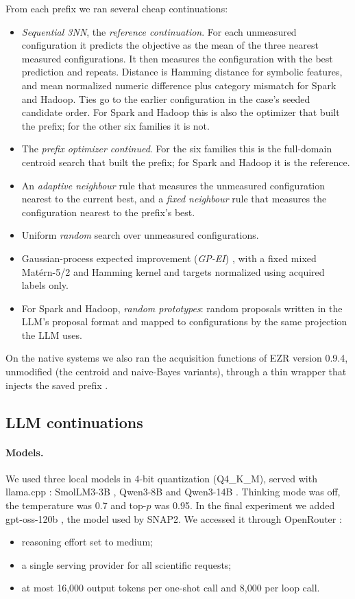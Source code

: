From each prefix we ran several cheap continuations:
\begin{itemize}
  \item \emph{Sequential 3NN}, the \emph{reference continuation}. For each unmeasured configuration it predicts the objective as the mean of the three nearest measured configurations. It then measures the configuration with the best prediction and repeats. Distance is Hamming distance for symbolic features, and mean normalized numeric difference plus category mismatch for Spark and Hadoop. Ties go to the earlier configuration in the case's seeded candidate order. For Spark and Hadoop this is also the optimizer that built the prefix; for the other six families it is not.
  \item The \emph{prefix optimizer continued}. For the six families this is the full-domain centroid search that built the prefix; for Spark and Hadoop it is the reference.
  \item An \emph{adaptive neighbour} rule that measures the unmeasured configuration nearest to the current best, and a \emph{fixed neighbour} rule that measures the configuration nearest to the prefix's best.
  \item Uniform \emph{random} search over unmeasured configurations.
  \item Gaussian-process expected improvement (\emph{GP-EI}) \cite{jones1998ego}, with a fixed mixed Mat\'ern-5/2 and Hamming kernel and targets normalized using acquired labels only.
  \item For Spark and Hadoop, \emph{random prototypes}: random proposals written in the LLM's proposal format and mapped to configurations by the same projection the LLM uses.
\end{itemize}
On the native systems we also ran the acquisition functions of EZR version 0.9.4, unmodified (the centroid and naive-Bayes variants), through a thin wrapper that injects the saved prefix \cite{menzies2026ezr}.

\subsection{LLM continuations}

\paragraph{Models.} We used three local models in 4-bit quantization (Q4\_K\_M), served with llama.cpp \cite{gerganov2023llamacpp}: SmolLM3-3B \cite{huggingface2025smollm3}, Qwen3-8B and Qwen3-14B \cite{qwen2025qwen3}. Thinking mode was off, the temperature was 0.7 and top-$p$ was 0.95. In the final experiment we added gpt-oss-120b \cite{openai2025gptoss}, the model used by SNAP2. We accessed it through OpenRouter \cite{openrouter2025}:
\begin{itemize}
  \item reasoning effort set to medium;
  \item a single serving provider for all scientific requests;
  \item at most 16,000 output tokens per one-shot call and 8,000 per loop call.
\end{itemize}

